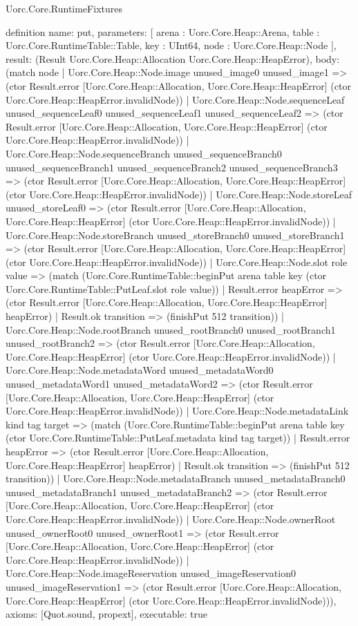 \begin{lexlean}{Uorc.Core.RuntimeFixtures}
\begin{semanticmodule}
definition{
  name: put,
  parameters: [
    arena : Uorc.Core.Heap::Arena,
    table : Uorc.Core.RuntimeTable::Table,
    key : UInt64,
    node : Uorc.Core.Heap::Node
  ],
  result: (Result Uorc.Core.Heap::Allocation Uorc.Core.Heap::HeapError),
  body: (match node
    | Uorc.Core.Heap::Node.image unused_image0 unused_image1 => (ctor Result.error [Uorc.Core.Heap::Allocation, Uorc.Core.Heap::HeapError] (ctor Uorc.Core.Heap::HeapError.invalidNode))
    | Uorc.Core.Heap::Node.sequenceLeaf unused_sequenceLeaf0 unused_sequenceLeaf1 unused_sequenceLeaf2 => (ctor Result.error [Uorc.Core.Heap::Allocation, Uorc.Core.Heap::HeapError] (ctor Uorc.Core.Heap::HeapError.invalidNode))
    | Uorc.Core.Heap::Node.sequenceBranch unused_sequenceBranch0 unused_sequenceBranch1 unused_sequenceBranch2 unused_sequenceBranch3 => (ctor Result.error [Uorc.Core.Heap::Allocation, Uorc.Core.Heap::HeapError] (ctor Uorc.Core.Heap::HeapError.invalidNode))
    | Uorc.Core.Heap::Node.storeLeaf unused_storeLeaf0 => (ctor Result.error [Uorc.Core.Heap::Allocation, Uorc.Core.Heap::HeapError] (ctor Uorc.Core.Heap::HeapError.invalidNode))
    | Uorc.Core.Heap::Node.storeBranch unused_storeBranch0 unused_storeBranch1 => (ctor Result.error [Uorc.Core.Heap::Allocation, Uorc.Core.Heap::HeapError] (ctor Uorc.Core.Heap::HeapError.invalidNode))
    | Uorc.Core.Heap::Node.slot role value => (match (Uorc.Core.RuntimeTable::beginPut arena table key (ctor Uorc.Core.RuntimeTable::PutLeaf.slot role value))
      | Result.error heapError => (ctor Result.error [Uorc.Core.Heap::Allocation, Uorc.Core.Heap::HeapError] heapError)
      | Result.ok transition => (finishPut 512 transition))
    | Uorc.Core.Heap::Node.rootBranch unused_rootBranch0 unused_rootBranch1 unused_rootBranch2 => (ctor Result.error [Uorc.Core.Heap::Allocation, Uorc.Core.Heap::HeapError] (ctor Uorc.Core.Heap::HeapError.invalidNode))
    | Uorc.Core.Heap::Node.metadataWord unused_metadataWord0 unused_metadataWord1 unused_metadataWord2 => (ctor Result.error [Uorc.Core.Heap::Allocation, Uorc.Core.Heap::HeapError] (ctor Uorc.Core.Heap::HeapError.invalidNode))
    | Uorc.Core.Heap::Node.metadataLink kind tag target => (match (Uorc.Core.RuntimeTable::beginPut arena table key (ctor Uorc.Core.RuntimeTable::PutLeaf.metadata kind tag target))
      | Result.error heapError => (ctor Result.error [Uorc.Core.Heap::Allocation, Uorc.Core.Heap::HeapError] heapError)
      | Result.ok transition => (finishPut 512 transition))
    | Uorc.Core.Heap::Node.metadataBranch unused_metadataBranch0 unused_metadataBranch1 unused_metadataBranch2 => (ctor Result.error [Uorc.Core.Heap::Allocation, Uorc.Core.Heap::HeapError] (ctor Uorc.Core.Heap::HeapError.invalidNode))
    | Uorc.Core.Heap::Node.ownerRoot unused_ownerRoot0 unused_ownerRoot1 => (ctor Result.error [Uorc.Core.Heap::Allocation, Uorc.Core.Heap::HeapError] (ctor Uorc.Core.Heap::HeapError.invalidNode))
    | Uorc.Core.Heap::Node.imageReservation unused_imageReservation0 unused_imageReservation1 => (ctor Result.error [Uorc.Core.Heap::Allocation, Uorc.Core.Heap::HeapError] (ctor Uorc.Core.Heap::HeapError.invalidNode))),
  axioms: [Quot.sound, propext],
  executable: true
}
\end{semanticmodule}
\end{lexlean}
